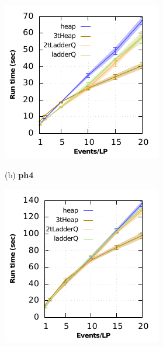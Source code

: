 \begin{figure}
\begin{minipage}{0.24\linewidth}
\includegraphics[width=\linewidth]{images/ph4_run_time}
\centerline{(b) \textbf{ph4}}
\end{minipage} 
\begin{minipage}{0.24\linewidth}
\includegraphics[width=\linewidth]{images/ph5_run_time}

\end{minipage}
\end{figure}
